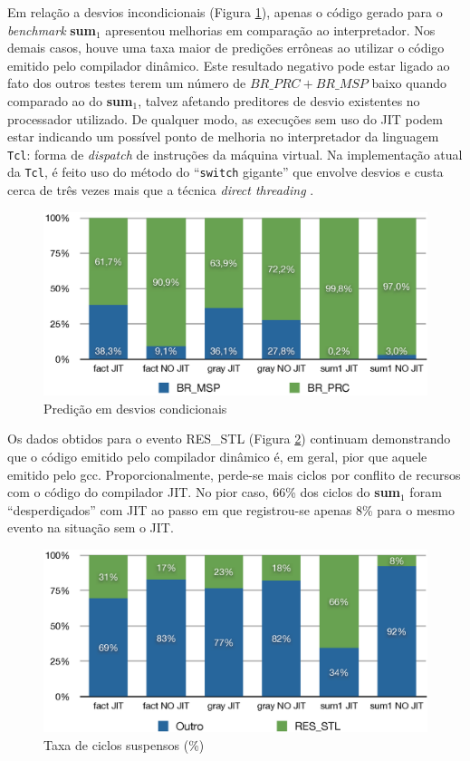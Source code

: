 Em relação a desvios incondicionais (Figura \ref{fig:branch}), apenas o
código gerado para o
\textit{benchmark} \textbf{sum$_1$} apresentou melhorias em comparação ao
interpretador. Nos demais casos, houve uma taxa maior de predições
errôneas ao utilizar o código emitido pelo compilador dinâmico. Este
resultado negativo pode estar ligado ao fato dos outros testes terem
um número de $BR\_PRC + BR\_MSP$ baixo quando comparado ao do
\textbf{sum$_1$}, talvez afetando preditores de desvio existentes no
processador utilizado. De qualquer modo, as execuções sem uso do JIT
podem estar indicando um possível ponto de melhoria no interpretador
da linguagem \texttt{Tcl}: forma de \textit{dispatch} de instruções da
máquina virtual. Na implementação atual da \texttt{Tcl}, é feito uso
do método do ``\verb!switch! gigante'' \cite{vmdispatch} que envolve
desvios e custa cerca
de três vezes mais que a técnica \textit{direct threading}
\cite{vmdispatch}.

\begin{figure}[h!]
  \centering
  \includegraphics[scale=0.70]{figs/branching}
  \caption{Predição em desvios condicionais \label{fig:branch}}
\end{figure}

Os dados obtidos para o evento RES\_STL (Figura \ref{fig:stalled})
continuam demonstrando que o código
emitido pelo compilador dinâmico é, em geral, pior que aquele emitido pelo gcc.
Proporcionalmente, perde-se mais ciclos por conflito de recursos com o
código do compilador JIT. No pior caso, 66\% dos ciclos do
\textbf{sum$_1$} foram ``desperdiçados'' com JIT ao passo em que
registrou-se apenas 8\% para o mesmo evento na situação sem o JIT.

\begin{figure}[ht!]
  \centering
  \includegraphics[scale=0.70]{figs/cyclestall}
  \caption{Taxa de ciclos suspensos (\%) \label{fig:stalled}}
\end{figure}

